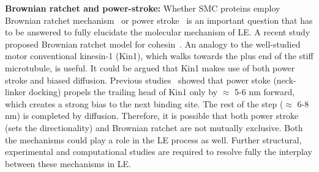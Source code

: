 \documentclass[fleqn,10pt]{wlscirep}
\begin{document}


{\bf Brownian ratchet and power-stroke:}
Whether SMC proteins employ Brownian ratchet mechanism~\cite{astumian1997thermodynamics} or power stroke~\cite{sindelar2002two} is an important question that has to be answered to fully elucidate the molecular mechanism of LE.  A recent study proposed Brownian ratchet model for cohesin~\cite{higashi2021brownian}. An analogy to the well-studied motor conventional kinesin-1 (Kin1), which walks towards the plus end of the stiff microtubule,  is useful. It could be argued that Kin1 makes use of both power stroke and biased diffusion.  Previous studies~\cite{zhang2017parsing,zhang2012dissecting} showed that power stoke (neck-linker docking) propels the trailing head of Kin1 only by $\approx$ 5-6 nm forward, which creates  a strong bias to the next binding site. The rest of the step ($\approx$ 6-8 nm) is completed by diffusion. Therefore, it is possible that both power stroke (sets the directionality)  and Brownian ratchet  are not mutually exclusive. Both the mechanisms could play a role in the LE process as well. Further structural, experimental  and computational studies are  required to resolve fully the interplay between these mechanisms in LE. 
\end{document}
